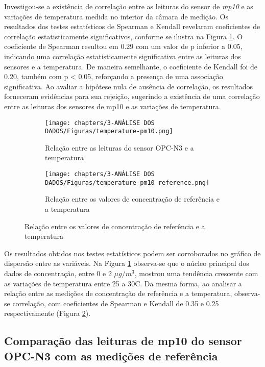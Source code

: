 Investigou-se a existência de correlação entre as leituras do sensor de \textit{mp10} e as variações de temperatura medida no interior da câmara de medição. Os resultados dos testes estatísticos de Spearman e Kendall revelaram coeficientes de correlação estatisticamente significativos, conforme se ilustra na Figura \ref{fig:data-temp-pm10-corr}. O coeficiente de Spearman resultou em 0.29 com um valor de p inferior a 0.05, indicando uma correlação estatisticamente significativa entre as leituras dos sensores e a temperatura. De maneira semelhante, o coeficiente de Kendall foi de 0.20, também com p < 0.05, reforçando a presença de uma associação significativa. Ao avaliar a hipótese nula de ausência de correlação, os resultados forneceram evidências para sua rejeição, sugerindo a existência de uma correlação entre as leituras dos sensores de \acrshort{mp10} e as variações de temperatura.

\begin{figure}[h]
    \centering
    \caption{Relação dos dados de concentração de \acrshort{mp10} com a temperatura}
    \begin{subfigure}{0.4\textwidth}
        \texttt{[image: chapters/3-ANÁLISE DOS DADOS/Figuras/temperature-pm10.png]}
        \caption{Relação entre as leituras do sensor OPC-N3 e a temperatura}
        \label{fig:data-temp-pm10-corr}
    \end{subfigure}
    \hfill
    \begin{subfigure}{0.4\textwidth}
        \texttt{[image: chapters/3-ANÁLISE DOS DADOS/Figuras/temperature-pm10-reference.png]}
        \caption{Relação entre os valores de concentração de referência e a temperatura}
        \label{fig:data-temp-pm10-ref-corr}
    \end{subfigure}
    \hfill
    \label{fig:data-pm10-temp}
\end{figure}

Os resultados obtidos nos testes estatísticos podem ser corroborados no gráfico de dispersão entre as variáveis. Na Figura \ref{fig:data-temp-pm10-corr} observa-se que o núcleo principal dos dados de concentração, entre 0 e 2 \(\mu g/m^3\), mostrou uma tendência crescente com as variações de temperatura entre 25 a 30\textdegree C. Da mesma forma, ao analisar a relação entre as medições de concentração de referência e a temperatura, observa-se correlação, com coeficientes de Spearman e Kendall de 0.35 e 0.25 respectivamente (Figura \ref{fig:data-temp-pm10-ref-corr}).

\subsection{Comparação das leituras de \acrshort{mp10} do sensor OPC-N3 com as medições de referência}

